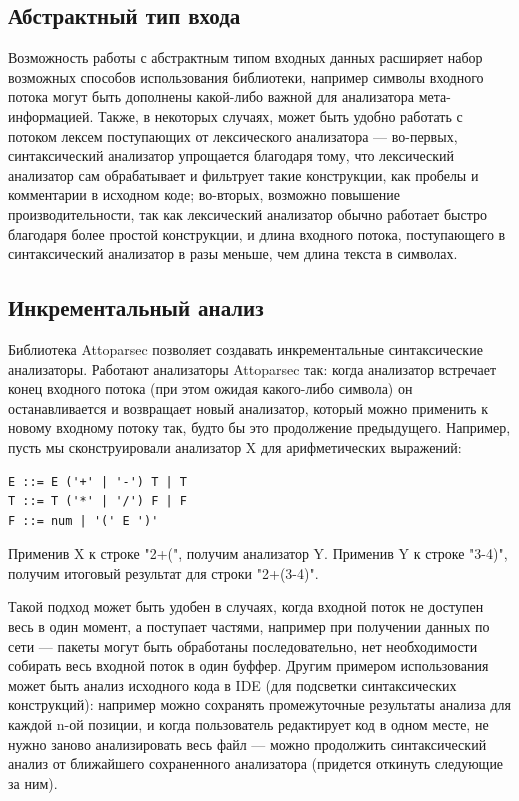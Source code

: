 \documentclass[14pt]{matmex-diploma}
\begin{document}
\subsection{Абстрактный тип входа}

Возможность работы с абстрактным типом входных данных расширяет набор возможных способов использования библиотеки, 
например символы входного потока могут быть дополнены какой-либо важной для анализатора мета-информацией.
Также, в некоторых случаях, может быть удобно работать с потоком лексем поступающих от лексического анализатора --- 
во-первых, синтаксический анализатор упрощается благодаря тому,
что лексический анализатор сам обрабатывает и фильтрует такие конструкции, 
как пробелы и комментарии в исходном коде; во-вторых, возможно повышение 
производительности, так как лексический анализатор обычно работает 
быстро благодаря более простой конструкции, и длина входного потока, 
поступающего в синтаксический анализатор в разы меньше, чем длина текста в символах.

\subsection{Инкрементальный анализ}
Библиотека Attoparsec позволяет создавать инкрементальные синтаксические 
анализаторы. Работают анализаторы Attoparsec так: когда анализатор встречает конец входного потока (при этом ожидая 
какого-либо символа) он останавливается и возвращает новый анализатор, 
который можно применить к новому входному потоку так, будто бы это 
продолжение предыдущего. Например, пусть мы сконструировали анализатор X 
для арифметических выражений:
\begin{lstlisting}
E ::= E ('+' | '-') T | T
T ::= T ('*' | '/') F | F
F ::= num | '(' E ')' 
\end{lstlisting}
Применив X к строке "2+(", получим анализатор Y. 
Применив Y к строке "3-4)", получим итоговый результат для строки "2+(3-4)". 

Такой подход может быть удобен в случаях, когда входной поток не доступен 
весь в один момент, а поступает частями, например при получении данных по сети --- 
пакеты могут быть обработаны последовательно, нет необходимости собирать весь 
входной поток в один буффер.
Другим примером использования может быть анализ исходного кода в IDE 
(для подсветки синтаксических конструкций): например можно сохранять 
промежуточные результаты анализа для каждой n-ой позиции, и когда 
пользователь редактирует код в одном месте, не нужно заново анализировать 
весь файл --- можно продолжить синтаксический анализ от ближайшего сохраненного 
анализатора (придется откинуть следующие за ним).
\end{document}
